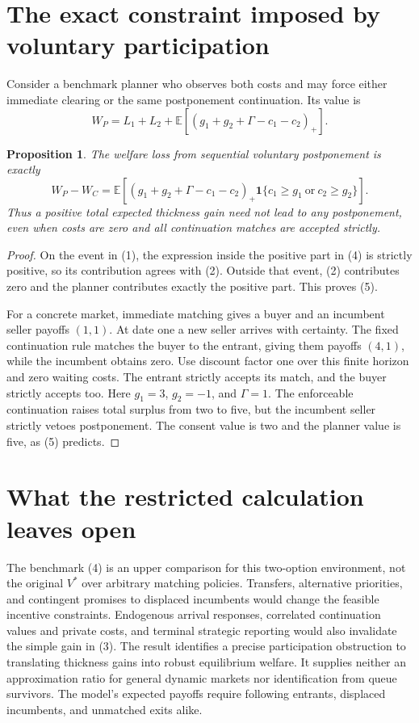 \documentclass[11pt]{article}
\newtheorem{proposition}[theorem]{Proposition}
\theoremstyle{definition}
\begin{document}
\section*{The exact constraint imposed by voluntary participation}
Consider a benchmark planner who observes both costs and may force either
immediate clearing or the same postponement continuation. Its value is
\[
 W_P=L_1+L_2+
       \mathbb E[(g_1+g_2+\Gamma-c_1-c_2)_+].            \tag{4}
\]
\begin{proposition}
The welfare loss from sequential voluntary postponement is exactly
\[
 W_P-W_C=
 \mathbb E\left[(g_1+g_2+\Gamma-c_1-c_2)_+
 \mathbf1\{c_1\ge g_1\ \text{or}\ c_2\ge g_2\}\right]. \tag{5}
\]
Thus a positive total expected thickness gain need not lead to any
postponement, even when costs are zero and all continuation matches are
accepted strictly.
\end{proposition}
\begin{proof}
On the event in (1), the expression inside the positive part in (4) is
strictly positive, so its contribution agrees with (2). Outside that
event, (2) contributes zero and the planner contributes exactly the
positive part. This proves (5).

For a concrete market, immediate matching gives a buyer and an incumbent
seller payoffs $(1,1)$. At date one a new seller arrives with certainty.
The fixed continuation rule matches the buyer to the entrant, giving
them payoffs $(4,1)$, while the incumbent obtains zero. Use discount factor
one over this finite horizon and zero waiting costs. The entrant strictly
accepts its match, and the buyer strictly accepts too. Here
$g_1=3$, $g_2=-1$, and $\Gamma=1$. The enforceable continuation raises
total surplus from two to five, but the incumbent seller strictly vetoes
postponement. The consent value is two and the planner value is five,
as (5) predicts.
\end{proof}

\section*{What the restricted calculation leaves open}
The benchmark (4) is an upper comparison for this two-option environment,
not the original $V^*$ over arbitrary matching policies. Transfers,
alternative priorities, and contingent promises to displaced incumbents
would change the feasible incentive constraints. Endogenous arrival
responses, correlated continuation values and private costs, and terminal
strategic reporting would also invalidate the simple gain in (3).
The result identifies a precise participation obstruction to translating
thickness gains into robust equilibrium welfare. It supplies neither an
approximation ratio for general dynamic markets nor identification from
queue survivors. The model's expected payoffs require following entrants,
displaced incumbents, and unmatched exits alike.
\end{document}
